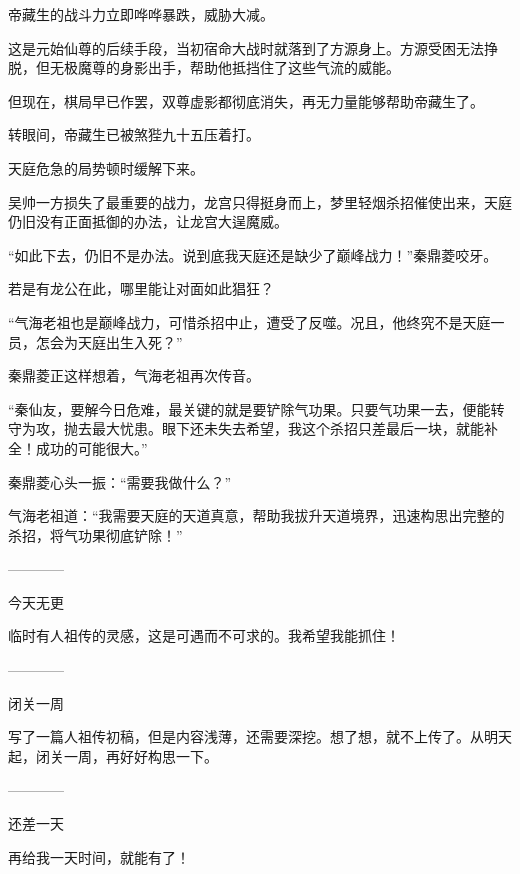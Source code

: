 \begin{this_body}
帝藏生的战斗力立即哗哗暴跌，威胁大减。

这是元始仙尊的后续手段，当初宿命大战时就落到了方源身上。方源受困无法挣脱，但无极魔尊的身影出手，帮助他抵挡住了这些气流的威能。

但现在，棋局早已作罢，双尊虚影都彻底消失，再无力量能够帮助帝藏生了。

转眼间，帝藏生已被煞狴九十五压着打。

天庭危急的局势顿时缓解下来。

吴帅一方损失了最重要的战力，龙宫只得挺身而上，梦里轻烟杀招催使出来，天庭仍旧没有正面抵御的办法，让龙宫大逞魔威。

“如此下去，仍旧不是办法。说到底我天庭还是缺少了巅峰战力！”秦鼎菱咬牙。

若是有龙公在此，哪里能让对面如此猖狂？

“气海老祖也是巅峰战力，可惜杀招中止，遭受了反噬。况且，他终究不是天庭一员，怎会为天庭出生入死？”

秦鼎菱正这样想着，气海老祖再次传音。

“秦仙友，要解今日危难，最关键的就是要铲除气功果。只要气功果一去，便能转守为攻，抛去最大忧患。眼下还未失去希望，我这个杀招只差最后一块，就能补全！成功的可能很大。”

秦鼎菱心头一振：“需要我做什么？”

气海老祖道：“我需要天庭的天道真意，帮助我拔升天道境界，迅速构思出完整的杀招，将气功果彻底铲除！”

------------

今天无更

临时有人祖传的灵感，这是可遇而不可求的。我希望我能抓住！

------------

闭关一周

写了一篇人祖传初稿，但是内容浅薄，还需要深挖。想了想，就不上传了。从明天起，闭关一周，再好好构思一下。

------------

还差一天

再给我一天时间，就能有了！

\end{this_body}

